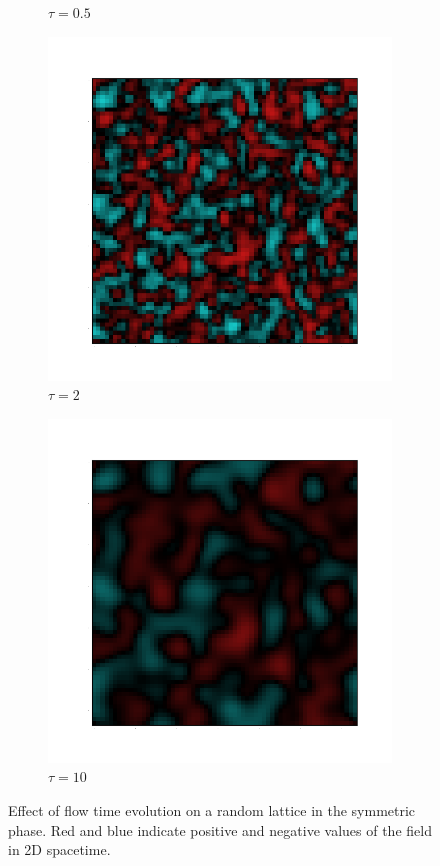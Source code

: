 \documentclass[12pt]{report}
\begin{document}
\begin{figure}[h]
\begin{subfigure}[b]{0.2\textwidth}
        \caption{$\tau=0.5$}
      \end{subfigure}
      \hfill
      \begin{subfigure}[b]{0.2\textwidth}\centering
        \includegraphics[width=\textwidth]{imgs/2.png}
        \caption{$\tau=2$}
      \end{subfigure}
      \hfill
      \begin{subfigure}[b]{0.2\textwidth}\centering
            \includegraphics[width=\textwidth]{imgs/10.png}
            \caption{$\tau=10$}
      \end{subfigure}
      \hfill
      \caption{\label{fig:flow} Effect of flow time evolution on a random lattice in the symmetric phase. Red and blue indicate positive and negative values of the field in 2D spacetime.}
  

\end{figure}
\end{document}

